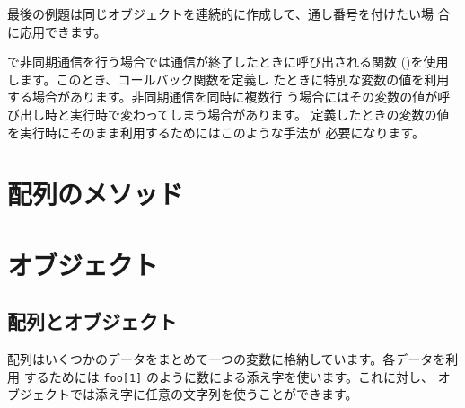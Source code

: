 最後の例題は同じオブジェクトを連続的に作成して、通し番号を付けたい場
合に応用できます。

で非同期通信を行う場合では通信が終了したときに呼び出される関数
()を使用します。このとき、コールバック関数を定義し
たときに特別な変数の値を利用する場合があります。非同期通信を同時に複数行
う場合にはその変数の値が呼び出し時と実行時で変わってしまう場合があります。
定義したときの変数の値を実行時にそのまま利用するためにはこのような手法が
必要になります。
\section{配列のメソッド}

 \section{オブジェクト}
\subsection{配列とオブジェクト}
配列はいくつかのデータをまとめて一つの変数に格納しています。各データを利用
するためには \verb+foo[1]+ のように数による添え字を使います。これに対し、
オブジェクトでは添え字に任意の文字列を使うことができます。


